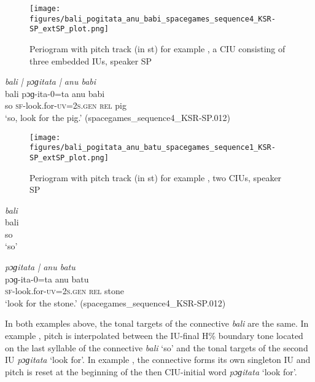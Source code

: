 \begin{figure}
	\texttt{[image: figures/bali\_pogitata\_anu\_babi\_spacegames\_sequence4\_KSR-SP\_extSP\_plot.png]}
	\caption{Periogram with pitch track (in st) for example , a CIU consisting of three embedded IUs, speaker SP}
	\label{pitch:bali pogitata anu babi}
\end{figure}

\newpage
\ea
\label{ex:bali pogitata anu babi}
\textit{bali | pɔɡitata | anu babi} \\
\gll bali pɔɡ-ita-0=ta anu babi	 \\
so \textsc{sf-}look.for\textsc{-uv=2s.gen} \textsc{rel} pig\\
\glt ‘so,  look for the pig.’ \hfill(spacegames\_sequence4\_KSR-SP.012)
\z


\begin{figure}
	\texttt{[image: figures/bali\_pogitata\_anu\_batu\_spacegames\_sequence1\_KSR-SP\_extSP\_plot.png]}
	\caption{Periogram with pitch track (in st) for example , two CIUs, speaker SP}
	\label{ex:pitch ...pogitata anu batu}
\end{figure}



\ea
\label{ex:bali ...pogitata anu batu}
\ea
	\label{ex:bali1}
	\textit{bali} \\
	\gll bali 	 \\
	so \\
	\glt ‘so’

	\ex
	\label{ex:pogitata anu batu1}
	\textit{pɔɡitata | anu batu} \\
	\gll pɔɡ-ita-0=ta anu batu	 \\
	\textsc{sf-}look.for\textsc{-uv=2s.gen} \textsc{rel} stone\\
	\glt ‘look for the stone.’ \hfill(spacegames\_sequence4\_KSR-SP.012)
\z
\z	




In both examples above, the tonal targets of the connective \textit{bali} are the same. In example , pitch is interpolated between the IU-final H\% boundary tone located on the last syllable of the connective \textit{bali} `so' and the tonal targets of the second IU \textit{pɔɡitata} `look for'. In example , the connective forms its own singleton IU and pitch is reset at the beginning of the then CIU-initial word \textit{pɔɡitata} ‘look for’.

